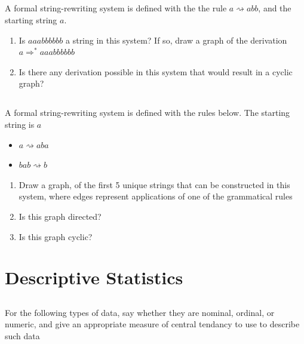 \documentclass[twocolumn]{article}
\begin{document}
\subsection{}

    A formal string-rewriting system is defined with the the rule $ a \rightsquigarrow abb $, and the starting string $a$.
    
    \begin{enumerate}
        \item Is $aaabbbbbb$ a string in this system? If so, draw a graph of the derivation $a \Rightarrow^* aaabbbbbb$
        \item Is there any derivation possible in this system that would result in a cyclic graph?
    \end{enumerate} 

\subsection{}

    A formal string-rewriting system is defined with the rules below. The starting string is $a$
    
    \begin{itemize}
        \item $ a \rightsquigarrow aba $
        \item $bab \rightsquigarrow b$
    \end{itemize} 

    \begin{enumerate}
        \item Draw a graph, of the first 5 unique strings that can be constructed in this system, where edges represent applications of one of the  grammatical rules
        \item Is this graph directed?
        \item Is this graph cyclic?
    \end{enumerate}

\clearpage
\section{Descriptive Statistics}

\subsection{}

    For the following types of data, say whether they are nominal, ordinal, or numeric, and give an appropriate measure of central tendancy to use to describe such data
\end{document}
